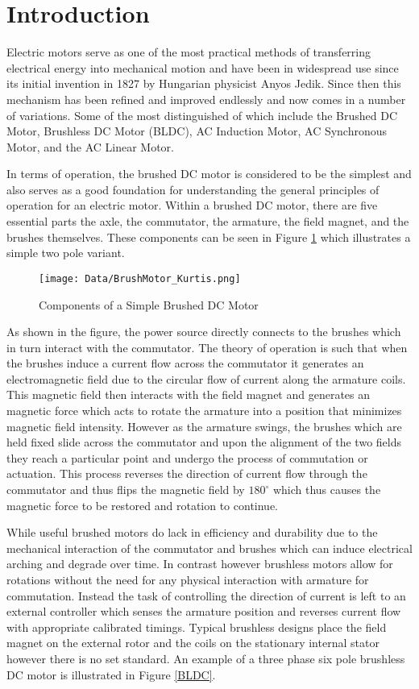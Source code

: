 \documentclass[12pt]{article}
\begin{document}
\section{Introduction}%

Electric motors serve as one of the most practical methods of transferring electrical energy into mechanical motion and have been in widespread use since its initial invention in 1827 by Hungarian physicist Anyos Jedik\cite{wiki:xxx}. Since then this mechanism has been refined and improved endlessly and now comes in a number of variations. Some of the most distinguished of which include the Brushed DC Motor, Brushless DC Motor (BLDC), AC Induction Motor, AC Synchronous Motor, and the AC Linear Motor.

In terms of operation, the brushed DC motor is considered to be the simplest and also serves as a good foundation for understanding the general principles of operation for an electric motor. Within a brushed DC motor, there are five essential parts the axle, the commutator, the armature, the field magnet, and the brushes themselves. These components can be seen in Figure \ref{DCMotor} which illustrates a simple two pole variant.

\begin{figure}[H]
\centering
\caption{Components of a Simple Brushed DC Motor\cite{dirjish_2012}}
\texttt{[image: Data/BrushMotor\_Kurtis.png]}
\label{DCMotor}
\end{figure}

As shown in the figure, the power source directly connects to the brushes which in turn interact with the commutator. The theory of operation is such that when the brushes induce a current flow across the commutator it generates an electromagnetic field due to the circular flow of current along the armature coils. This magnetic field then interacts with the field magnet and generates an magnetic force which acts to rotate the armature into a position that minimizes magnetic field intensity. However as the armature swings, the brushes which are held fixed slide across the commutator and upon the alignment of the two fields they reach a particular point and undergo the process of commutation or actuation. This process reverses the direction of current flow through the commutator and thus flips the magnetic field by $180^{\circ}$ which thus causes the magnetic force to be restored and rotation to continue.

While useful brushed motors do lack in efficiency and durability due to the mechanical interaction of the commutator and brushes which can induce electrical arching and degrade over time. In contrast however brushless motors allow for rotations without the need for any physical interaction with armature for commutation. Instead the task of controlling the direction of current is left to an external controller which senses the armature position and reverses current flow with appropriate calibrated timings. Typical brushless designs place the field magnet on the external rotor and the coils on the stationary internal stator however there is no set standard. An example of a three phase six pole brushless DC motor is illustrated in Figure \ref{BLDC}.
\end{document}
